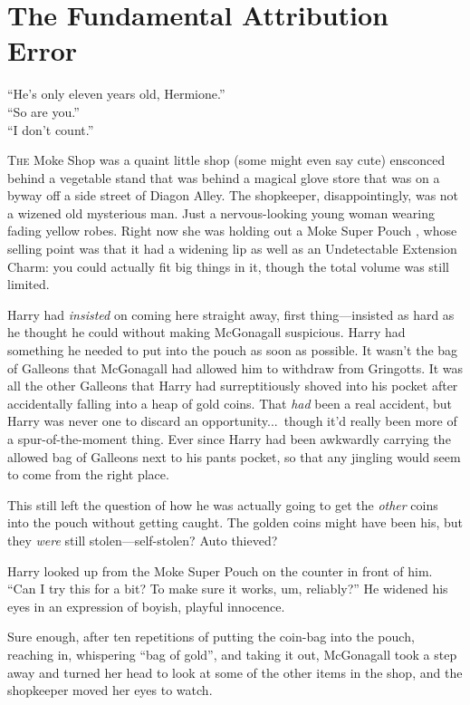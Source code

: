 \chapter{The Fundamental Attribution Error}

\epigraph{“He’s only eleven years old, Hermione.”\\“So are you.”\\“I don’t count.”}{}

\lettrine{T}{he} Moke Shop was a quaint little shop (some might even say cute) ensconced behind a vegetable stand that was behind a magical glove store that was on a byway off a side street of Diagon Alley. The shopkeeper, disappointingly, was not a wizened old mysterious man. Just a nervous-looking young woman wearing fading yellow robes. Right now she was holding out a Moke Super Pouch , whose selling point was that it had a widening lip as well as an Undetectable Extension Charm: you could actually fit big things in it, though the total volume was still limited.

Harry had \emph{insisted} on coming here straight away, first thing—insisted as hard as he thought he could without making McGonagall suspicious. Harry had something he needed to put into the pouch as soon as possible. It wasn’t the bag of Galleons that McGonagall had allowed him to withdraw from Gringotts. It was all the other Galleons that Harry had surreptitiously shoved into his pocket after accidentally falling into a heap of gold coins. That \emph{had} been a real accident, but Harry was never one to discard an opportunity...\ though it’d really been more of a spur-of-the-moment thing. Ever since Harry had been awkwardly carrying the allowed bag of Galleons next to his pants pocket, so that any jingling would seem to come from the right place.

This still left the question of how he was actually going to get the \emph{other} coins into the pouch without getting caught. The golden coins might have been his, but they \emph{were} still stolen—self-stolen? Auto thieved?

Harry looked up from the Moke Super Pouch  on the counter in front of him. “Can I try this for a bit? To make sure it works, um, reliably?” He widened his eyes in an expression of boyish, playful innocence.

Sure enough, after ten repetitions of putting the coin-bag into the pouch, reaching in, whispering “bag of gold”, and taking it out, McGonagall took a step away and turned her head to look at some of the other items in the shop, and the shopkeeper moved her eyes to watch.

